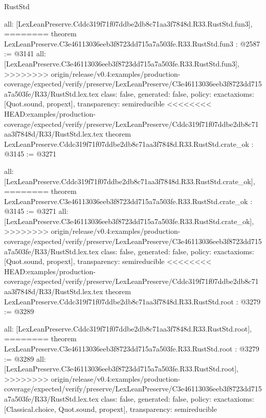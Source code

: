 \begin{lexlean}{RustStd}
\begin{coremodule}
{\begin{coremodule}
{{{{{{  all: [LexLeanPreserve.Cddc319f71f07ddbe2db8c71aa3f7848d.R33.RustStd.fun3],
========
theorem LexLeanPreserve.C3e46113036eeb3f8723dd715a7a503fe.R33.RustStd.fun3 : @2587 := @3141 {
  all: [LexLeanPreserve.C3e46113036eeb3f8723dd715a7a503fe.R33.RustStd.fun3],
>>>>>>>> origin/release/v0.4:examples/production-coverage/expected/verify/preserve/LexLeanPreserve/C3e46113036eeb3f8723dd715a7a503fe/R33/RustStd.lex.tex
  class: false,
  generated: false,
  policy: exact{axioms: [Quot.sound, propext]},
  transparency: semireducible
}
<<<<<<<< HEAD:examples/production-coverage/expected/verify/preserve/LexLeanPreserve/Cddc319f71f07ddbe2db8c71aa3f7848d/R33/RustStd.lex.tex
theorem LexLeanPreserve.Cddc319f71f07ddbe2db8c71aa3f7848d.R33.RustStd.crate_ok : @3145 := @3271 {
  all: [LexLeanPreserve.Cddc319f71f07ddbe2db8c71aa3f7848d.R33.RustStd.crate_ok],
========
theorem LexLeanPreserve.C3e46113036eeb3f8723dd715a7a503fe.R33.RustStd.crate_ok : @3145 := @3271 {
  all: [LexLeanPreserve.C3e46113036eeb3f8723dd715a7a503fe.R33.RustStd.crate_ok],
>>>>>>>> origin/release/v0.4:examples/production-coverage/expected/verify/preserve/LexLeanPreserve/C3e46113036eeb3f8723dd715a7a503fe/R33/RustStd.lex.tex
  class: false,
  generated: false,
  policy: exact{axioms: [Quot.sound, propext]},
  transparency: semireducible
}
<<<<<<<< HEAD:examples/production-coverage/expected/verify/preserve/LexLeanPreserve/Cddc319f71f07ddbe2db8c71aa3f7848d/R33/RustStd.lex.tex
theorem LexLeanPreserve.Cddc319f71f07ddbe2db8c71aa3f7848d.R33.RustStd.root : @3279 := @3289 {
  all: [LexLeanPreserve.Cddc319f71f07ddbe2db8c71aa3f7848d.R33.RustStd.root],
========
theorem LexLeanPreserve.C3e46113036eeb3f8723dd715a7a503fe.R33.RustStd.root : @3279 := @3289 {
  all: [LexLeanPreserve.C3e46113036eeb3f8723dd715a7a503fe.R33.RustStd.root],
>>>>>>>> origin/release/v0.4:examples/production-coverage/expected/verify/preserve/LexLeanPreserve/C3e46113036eeb3f8723dd715a7a503fe/R33/RustStd.lex.tex
  class: false,
  generated: false,
  policy: exact{axioms: [Classical.choice, Quot.sound, propext]},
  transparency: semireducible
}

}}}}}}}}
\end{coremodule}}
\end{coremodule}
\end{lexlean}
